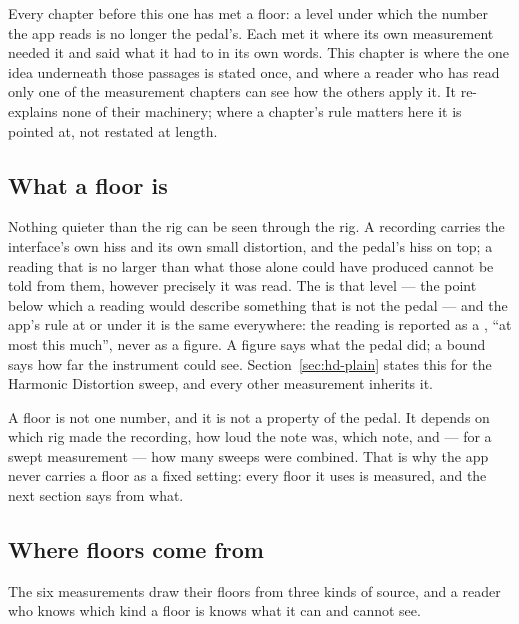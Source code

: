 \documentclass[11pt,a4paper]{article}
\begin{document}
Every chapter before this one has met a floor: a level under which the
number the app reads is no longer the pedal's. Each met it where its own
measurement needed it and said what it had to in its own words. This
chapter is where the one idea underneath those passages is stated once,
and where a reader who has read only one of the measurement chapters can
see how the others apply it. It re-explains none of their machinery; where
a chapter's rule matters here it is pointed at, not restated at length.

\subsection{What a floor is}

Nothing quieter than the rig can be seen through the rig. A recording
carries the interface's own hiss and its own small distortion, and the
pedal's hiss on top; a reading that is no larger than what those alone
could have produced cannot be told from them, however precisely it was
read. The  is that level --- the point below which a reading
would describe something that is not the pedal --- and the app's rule at
or under it is the same everywhere: the reading is reported as a
, ``at most this much'', never as a figure. A figure
says what the pedal did; a bound says how far the instrument could see.
Section~\ref{sec:hd-plain} states this for the Harmonic Distortion sweep,
and every other measurement inherits it.

A floor is not one number, and it is not a property of the pedal. It
depends on which rig made the recording, how loud the note was, which
note, and --- for a swept measurement --- how many sweeps were combined.
That is why the app never carries a floor as a fixed setting: every floor
it uses is measured, and the next section says from what.

\subsection{Where floors come from}

The six measurements draw their floors from three kinds of source, and a
reader who knows which kind a floor is knows what it can and cannot see.
\end{document}
